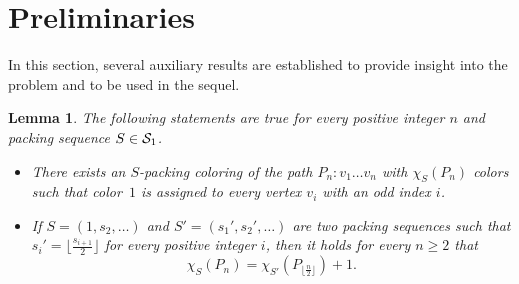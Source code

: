 \documentclass[12pt]{article}
\newtheorem{lemma}[theorem]{Lemma}
\newcommand{\s}{\color{blue}}
\newcommand{\cS}{{\cal S}}
\begin{document}
\section{Preliminaries} \label{sec:preliminaries}

 In this section, several auxiliary results are established to provide insight into the problem and to be used in the sequel.



\begin{lemma} \label{lem:path1}
    The following statements are true for every positive integer $n$ and packing sequence $S \in \cS_1$.
    \begin{itemize}
        \item[(i)] There exists an $S$-packing coloring of the path $P_n\colon v_1 \dots v_n$ with $\chi_S(P_n)$ colors such that color~$1$ is assigned to every vertex $v_i$ with an odd index $i$.
         \item[(ii)] If  $S=(1,s_2, \dots)$ and $S'=(s_1', s_2', \dots )$ are two packing sequences such that $s_i'=\lfloor \frac{s_{i+1}}{2} \rfloor$ for every positive integer $i$, then it holds for every $n\ge 2$ that
         \begin{equation} \label{eq:path-half}
             \chi_S(P_n)=\chi_{S'}(P_{\lfloor \frac{n}{2} \rfloor} )+1.
         \end{equation} 
    \end{itemize}
    
     
\end{lemma}
\end{document}
